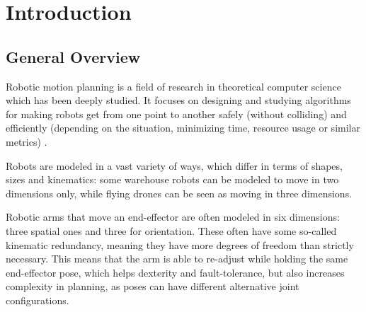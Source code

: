 \section{Introduction}


\subsection{General Overview}

Robotic motion planning is a field of research in theoretical computer science which has been deeply studied. 
It focuses on designing and studying algorithms for making robots get from one point to another safely (without colliding) and efficiently (depending on the situation, minimizing time, resource usage or similar metrics) \cite{chosetPrinciplesRobotMotion2005}.

Robots are modeled in a vast variety of ways, which differ in terms of shapes, sizes and kinematics: 
some warehouse robots can be modeled to move in two dimensions only, while flying drones can be seen as moving in three dimensions.

Robotic arms that move an end-effector are often modeled in six dimensions: three spatial ones and three for orientation. 
These  often have some so-called kinematic redundancy, meaning they have more degrees of freedom than strictly necessary. 
This means that the arm is able to re-adjust while holding the same end-effector pose, which helps dexterity and fault-tolerance, but also increases complexity in planning, as poses can have different alternative joint configurations. 
\cite{sicilianoSpringerHandbookRobotics2016}

